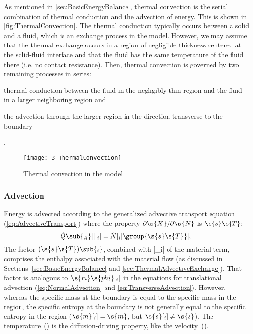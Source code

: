 As mentioned in \autoref{sec:BasicEnergyBalance}, thermal convection is the serial combination of thermal conduction and the advection of energy.  This is shown in \autoref{fig:ThermalConvection}.  The thermal conduction typically occurs between a solid and a fluid, which is an exchange process in the model.  However, we may assume that the thermal exchange occurs in a region of negligible thickness centered at the solid-fluid interface and that the fluid has the same temperature of the fluid there (i.e, no contact resistance).  Then, thermal convection is governed by two remaining processes in series: \begin{inparaenum}[(1)]\item thermal conduction between the fluid in the negligibly thin region and the fluid in a larger neighboring region and \item the advection through the larger region in the direction transverse to the boundary\end{inparaenum}.

\begin{figure}[htbp]
  \texttt{[image: 3-ThermalConvection]}%
  \caption{Thermal convection in the model}%
  \label{fig:ThermalConvection}
\end{figure}


\subsubsection{Advection}

Energy is advected according to the generalized advective transport equation (\ref{eq:AdvectiveTransport}) where the property $\partial\s{X}/\partial\s{N}$ is $\s{s}\s{T}$:
\begin{equation}
  \label{eq:ThermalAdvectiveTransport}
  \dot{Q}\sub{_A}[ ][_i] = \dot{N}[_i]\group{\s{s}\s{T}}[_i]
\end{equation}
The factor $(\s{s}\s{T})\sub{_i}$, combined with [_i] of the material term, comprises the enthalpy associated with the material flow (as discussed in Sections~\ref{sec:BasicEnergyBalance} and \ref{sec:ThermalAdvectiveExchange}).  That factor is analogous to $\s{m}\s{phi}[_i]$ in the equations for translational advection (\ref{eq:NormalAdvection} and \ref{eq:TransverseAdvection}).  However, whereas the specific mass at the boundary is equal to the specific mass in the region, the specific entropy at the boundary is not generally equal to the specific entropy in the region ($\s{m}[_i] = \s{m}$, but $\s{s}[_i] \ne \s{s}$).  The temperature~() is the diffusion-driving property, like the velocity~().


